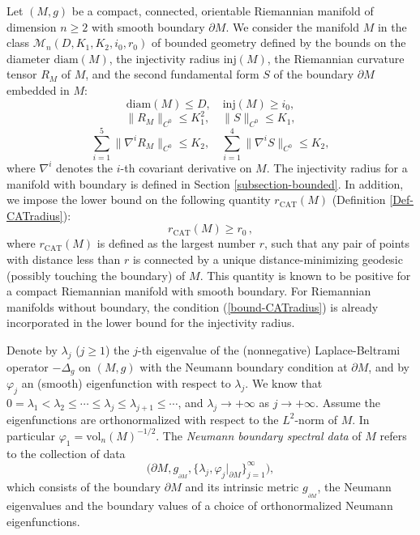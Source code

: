 \documentclass[11pt,letterpaper]{amsart}
\numberwithin{equation}{section}
\theoremstyle{definition}
\theoremstyle{plain}
\theoremstyle{definition}
\theoremstyle{plain}
\theoremstyle{definition}
\theoremstyle{plain}
\begin{document}
\smallskip
Let $(M,g)$ be a compact, connected, orientable Riemannian manifold of dimension $n\geqslant 2$ with smooth boundary $\partial M$. We consider the manifold $M$ in the class $\mathcal{M}_n(D,K_1,K_2,i_0,r_0)$ of bounded geometry defined by the bounds on the diameter $\textrm{diam}(M)$, the injectivity radius $\textrm{inj}(M)$, the Riemannian curvature tensor $R_M$ of $M$, and the second fundamental form $S$ of the boundary $\partial M$ embedded in $M$:
$$\textrm{diam}(M)\leqslant D, \quad \textrm{inj}(M)\geqslant i_0,$$
$$\|R_M\|_{C^0}\leqslant K_1^2,\quad \|S\|_{C^0}\leqslant K_1,$$
\begin{equation}\label{boundedgeometry}
\sum_{i=1}^5 \|\nabla^i R_M\|_{C^0}\leqslant K_2,\quad \sum_{i=1}^4 \|\nabla^i S\|_{C^0}\leqslant K_2,
\end{equation}
where $\nabla^i$ denotes the $i$-th covariant derivative on $M$. The injectivity radius for a manifold with boundary is defined in Section \ref{subsection-bounded}. In addition, we impose the lower bound on the following quantity $r_{\textrm{CAT}}(M)$ (Definition \ref{Def-CATradius}):
\begin{equation}\label{bound-CATradius}
r_{\textrm{CAT}}(M)\geqslant r_0\, ,
\end{equation}
where $r_{\textrm{CAT}}(M)$ is defined as the largest number $r$, such that any pair of points with distance less than $r$ is connected by a unique distance-minimizing geodesic (possibly touching the boundary) of $M$. This quantity is known to be positive for a compact Riemannian manifold with smooth boundary. For Riemannian manifolds without boundary, the condition (\ref{bound-CATradius}) is already incorporated in the lower bound for the injectivity radius.

Denote by $\lambda_j$ ($j\geqslant 1$) the $j$-th eigenvalue of the (nonnegative) Laplace-Beltrami operator $-\Delta_g$ on $(M,g)$ with the Neumann boundary condition at $\partial M$, and by $\varphi_j$ an (smooth) eigenfunction with respect to $\lambda_j$. We know that $0=\lambda_1<\lambda_2\leqslant \cdots \leqslant \lambda_j\leqslant \lambda_{j+1}\leqslant \cdots$, and $\lambda_j\to +\infty$ as $j\to +\infty$. Assume the eigenfunctions are orthonormalized with respect to the $L^2$-norm of $M$. In particular $\varphi_1=\textrm{vol}_n(M)^{-1/2}$. The \emph{Neumann boundary spectral data} of $M$ refers to the collection of data 
$$\Big(\partial M,g_{_{\partial M}}, \{\lambda_j,\varphi_j|_{\partial M}\}_{j=1}^{\infty}\Big),$$ 
which consists of the boundary $\partial M$ and its intrinsic metric $g_{_{\partial M}}$, the Neumann eigenvalues and the boundary values of a choice of orthonormalized Neumann eigenfunctions.
\end{document}
